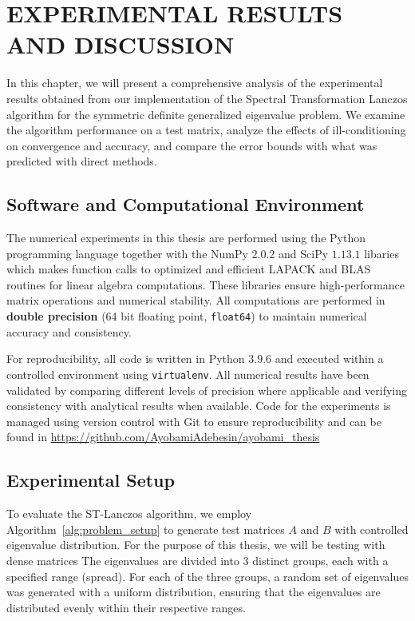 \chapter{EXPERIMENTAL RESULTS AND DISCUSSION}

In this chapter, we will present a comprehensive analysis of the experimental results obtained from our implementation of the Spectral Transformation Lanczos algorithm for the symmetric definite generalized eigenvalue problem. We examine the algorithm performance on a test matrix, analyze the effects of ill-conditioning on convergence and accuracy, and compare the error bounds with what was predicted with direct methods.

\section{Software and Computational Environment}
The numerical experiments in this thesis are performed using the Python programming language together with the NumPy $2.0.2$ and SciPy $1.13.1$ libaries which makes function calls to optimized and efficient LAPACK and BLAS routines for linear algebra computations. These libraries ensure high-performance matrix operations and numerical stability. All computations are performed in \textbf{double precision} (64 bit floating point, \texttt{float64}) to maintain numerical accuracy and consistency.

For reproducibility, all code is written in Python $3.9.6$ and executed within a controlled environment using \texttt{virtualenv}. All numerical results have been validated by comparing different levels of precision where applicable and verifying consistency with analytical results when available. Code for the experiments is managed using version control with Git to ensure reproducibility and can be found in \href{https://github.com/AyobamiAdebesin/ayobami_thesis}{https://github.com/AyobamiAdebesin/ayobami\_thesis}

\section{Experimental Setup}
To evaluate the ST-Lanczos algorithm, we employ Algorithm~\ref{alg:problem_setup} to generate test matrices $A$ and $B$ with controlled eigenvalue distribution. For the purpose of this thesis, we will be testing with dense matrices The eigenvalues are divided into 3 distinct groups, each with a specified range (spread). For each of the three groups, a random set of eigenvalues was generated with a uniform distribution, ensuring that the eigenvalues are distributed evenly within their respective ranges.

